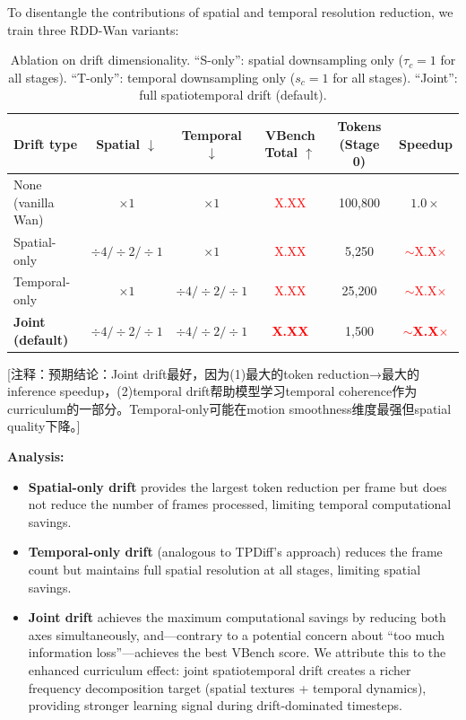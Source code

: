 To disentangle the contributions of spatial and temporal resolution reduction, we train three RDD-Wan variants:

\begin{table}[t]
\centering
\caption{Ablation on drift dimensionality. ``S-only'': spatial downsampling only ($\tau_c = 1$ for all stages). ``T-only'': temporal downsampling only ($s_c = 1$ for all stages). ``Joint'': full spatiotemporal drift (default).}
\label{tab:video_ablation_drift}
\small
\begin{tabular}{@{}lccccc@{}}
\toprule
\textbf{Drift type} & \textbf{Spatial} $\downarrow$ & \textbf{Temporal} $\downarrow$ & \textbf{VBench Total} $\uparrow$ & \textbf{Tokens (Stage 0)} & \textbf{Speedup} \\
\midrule
None (vanilla Wan) & $\times 1$ & $\times 1$ & \textcolor{red}{X.XX} & 100,800 & $1.0\times$ \\
Spatial-only & $\div 4 / \div 2 / \div 1$ & $\times 1$ & \textcolor{red}{X.XX} & 5,250 & \textcolor{red}{$\sim$X.X$\times$} \\
Temporal-only & $\times 1$ & $\div 4 / \div 2 / \div 1$ & \textcolor{red}{X.XX} & 25,200 & \textcolor{red}{$\sim$X.X$\times$} \\
\textbf{Joint (default)} & $\div 4 / \div 2 / \div 1$ & $\div 4 / \div 2 / \div 1$ & \textcolor{red}{\textbf{X.XX}} & 1,500 & \textcolor{red}{$\sim$\textbf{X.X}$\times$} \\
\bottomrule
\end{tabular}
\end{table}

\textcolor{green!50!black}{[注释：预期结论：Joint drift最好，因为(1)最大的token reduction→最大的inference speedup，(2)temporal drift帮助模型学习temporal coherence作为curriculum的一部分。Temporal-only可能在motion smoothness维度最强但spatial quality下降。]}

\textbf{Analysis:}
\begin{itemize}
    \item \textbf{Spatial-only drift} provides the largest token reduction per frame but does not reduce the number of frames processed, limiting temporal computational savings.
    \item \textbf{Temporal-only drift} (analogous to TPDiff's approach) reduces the frame count but maintains full spatial resolution at all stages, limiting spatial savings.
    \item \textbf{Joint drift} achieves the maximum computational savings by reducing both axes simultaneously, and---contrary to a potential concern about ``too much information loss''---achieves the best VBench score. We attribute this to the enhanced curriculum effect: joint spatiotemporal drift creates a richer frequency decomposition target (spatial textures + temporal dynamics), providing stronger learning signal during drift-dominated timesteps.
\end{itemize}

